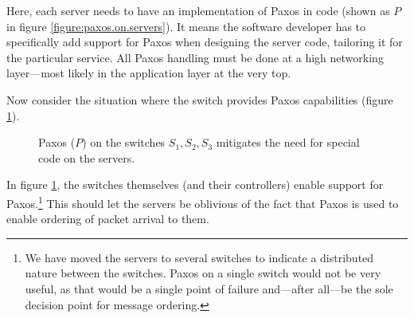 Here, each server needs to have an implementation of Paxos in code (shown as
$P$ in figure \ref{figure:paxos.on.servers}).  It means the software
developer has to specifically add support for Paxos when designing the
server code, tailoring it for the particular service.  All Paxos handling
must be done at a high networking layer---most
likely in the application layer at the very top.

Now consider the situation where the switch provides Paxos
capabilities (figure \ref{figure:paxos.on.switches}).

\begin{figure}[H]
  \centering
  \caption{Paxos ($P$) on the switches $S_1, S_2, S_3$ mitigates the need for special code on the servers.}
  \label{figure:paxos.on.switches}
\end{figure}

In figure \ref{figure:paxos.on.switches}, the switches themselves (and their
controllers) enable
support for Paxos.\footnote{We have moved the servers to several switches
to indicate a distributed nature between the switches.
Paxos on a single switch would not be very useful, as that would be a single
point of failure and---after all---be the sole decision point for message
ordering.}
This should let the servers be oblivious of the fact that Paxos is used to
enable ordering of packet arrival to them.

